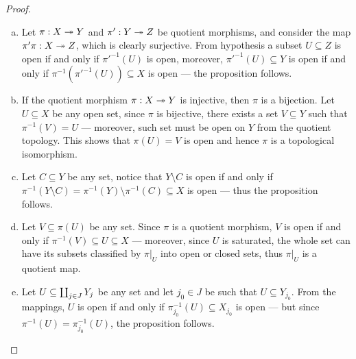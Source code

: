 \begin{proof}
    \begin{enumerate}[(a)]\setlength\itemsep{0em}
        \item Let \(\pi: X \twoheadrightarrow Y\) and \(\pi': Y \twoheadrightarrow Z\) be quotient morphisms, and
              consider the map \(\pi' \pi: X \twoheadrightarrow Z\), which is clearly surjective. From
              hypothesis a subset \(U \subseteq Z\) is open if and only if \(\pi'^{-1}(U)\)
              is open, moreover, \(\pi'^{-1}(U) \subseteq Y\) is open if and only if
              \(\pi^{-1}(\pi'^{-1}(U)) \subseteq X\) is open --- the proposition follows.
        \item If the quotient morphism \(\pi: X \twoheadrightarrow Y\) is injective, then \(\pi\) is a
              bijection. Let \(U \subseteq X\) be any open set, since \(\pi\) is bijective,
              there exists a set \(V \subseteq Y\) such that \(\pi^{-1}(V) = U\) ---
              moreover, such set must be open on \(Y\) from the quotient topology. This
              shows that \(\pi(U) = V\) is open and hence \(\pi\) is a topological
              isomorphism.
        \item Let \(C \subseteq Y\) be any set, notice that \(Y \setminus C\) is open
              if and only if \(\pi^{-1}(Y \setminus C) = \pi^{-1}(Y) \setminus \pi^{-1}(C)
              \subseteq X\) is open --- thus the proposition follows.
        \item Let \(V \subseteq \pi(U)\) be any set. Since \(\pi\) is a quotient
              morphism, \(V\) is open if and only if \(\pi^{-1}(V) \subseteq U \subseteq
              X\) --- moreover, since \(U\) is saturated, the whole set can have its subsets
              classified by \(\pi|_U\) into open or closed sets, thus \(\pi|_U\) is a
              quotient map.
        \item Let \(U \subseteq \coprod_{j \in J} Y_j\) be any set and let \(j_{0} \in
              J\) be such that \(U \subseteq Y_{j_0}\). From the mappings, \(U\) is open if
              and only if \(\pi^{-1}_{j_0}(U) \subseteq X_{j_0}\) is open --- but since
              \(\pi^{-1}(U) = \pi^{-1}_{j_0}(U)\), the proposition follows.
    \end{enumerate}
\end{proof}

